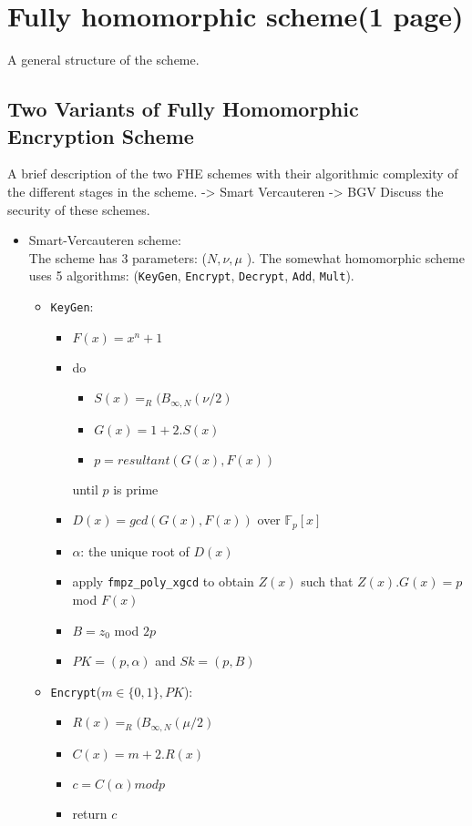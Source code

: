 \documentclass{acm_proc_article-sp}
\begin{document}
\section{Fully homomorphic scheme(1 page)}
A general structure of the scheme.
\subsection{Two Variants of Fully Homomorphic Encryption Scheme}
A brief description of the two FHE schemes with their algorithmic complexity of the different stages in the scheme. 
-> Smart Vercauteren
-> BGV
Discuss the security of these schemes.



\begin{itemize}
\item Smart-Vercauteren scheme:\\
The scheme \cite{cryptoeprint:2009:571} has 3 parameters: ($N, \nu, \mu$ ). The somewhat homomorphic scheme uses 5 algorithms: (\texttt{KeyGen}, \texttt{Encrypt}, \texttt{Decrypt}, \texttt{Add}, \texttt{Mult}).
\begin{itemize}
\item \texttt{KeyGen}:
\begin{itemize}
\item $F(x)= x^{n}+1$
\item do
\begin{itemize}
\item $S(x)=_{R}(B_{\infty , N}(\nu/2)$
\item $G(x)=1+2.S(x)$
\item $p= resultant(G(x),F(x))$
\end{itemize}
until $p$ is prime
\item $D(x)=gcd(G(x),F(x))$ over $\mathbb{F}_p[x]$
\item $\alpha$: the unique root of $D(x)$
\item apply \texttt{fmpz\_poly\_xgcd} to obtain $Z(x)$ such that $Z(x).G(x)=p$ mod $F(x)$
\item $B=z_0$ mod $2p$
\item $PK = (p, \alpha)$ and $Sk = (p , B)$
\end{itemize}
\item \texttt{Encrypt}($m \in \{0,1\} , PK$):
\begin{itemize}
\item $R(x)=_{R}(B_{\infty , N}(\mu/2)$
\item $C(x)=m+2.R(x)$
\item $c=C(\alpha) mod p$
\item return $c$

\end{itemize}
\end{itemize}
\end{itemize}
\end{document}
